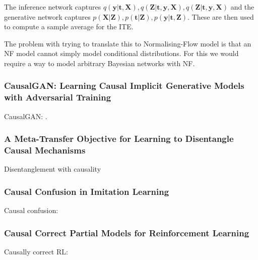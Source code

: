 \documentclass{article}
\newcommand{\bt}{\mathbf{t}}
\newcommand{\bX}{\mathbf{X}}
\newcommand{\by}{\mathbf{y}}
\newcommand{\bZ}{\mathbf{Z}}
\begin{document}
\noindent
The inference network captures $q(\by | \bt , \bX), q(\bZ | \bt, \by, \bX), q(\bZ| \bt, \by, \bX)$ and the generative network captures $p(\bX | \bZ), p(\bt | \bZ), p(\by | \bt, \bZ)$. These are then used to compute a sample average for the ITE.

The problem with trying to translate this to Normalising-Flow model is that an NF model cannot simply model conditional distributions. For this we would require a way to model arbitrary Bayesian networks with NF. 


\subsubsection*{CausalGAN: Learning Causal Implicit Generative Models with Adversarial Training}
CausalGAN: \cite{kocaoglu2017causalgan}.

\subsubsection*{A Meta-Transfer Objective for Learning to Disentangle Causal Mechanisms}
Disentanglement with causality \cite{Bengio2020A}

\subsubsection*{Causal Confusion in Imitation Learning}
Causal confusion: \cite{de2019causal}

\subsubsection*{Causal Correct Partial Models for Reinforcement Learning}
Causally correct RL: \cite{rezende2020causally}

\end{document}
